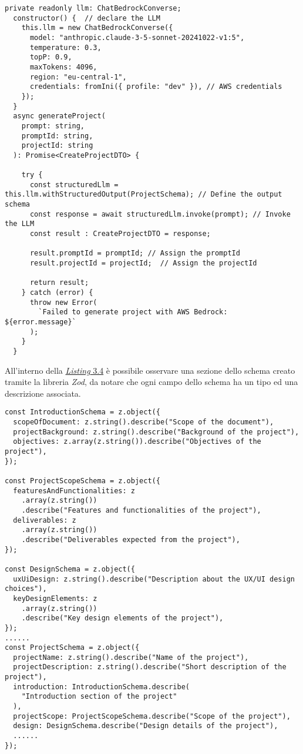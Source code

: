 \begin{lstlisting}[caption={Dichiarazione \gls{llm} e sua invocazione}, label={lst:funzione-generazione-progetto}]
private readonly llm: ChatBedrockConverse;
  constructor() {  // declare the LLM
    this.llm = new ChatBedrockConverse({
      model: "anthropic.claude-3-5-sonnet-20241022-v1:5",
      temperature: 0.3,
      topP: 0.9,
      maxTokens: 4096,
      region: "eu-central-1",
      credentials: fromIni({ profile: "dev" }), // AWS credentials
    });
  }
  async generateProject(
    prompt: string,
    promptId: string,
    projectId: string
  ): Promise<CreateProjectDTO> {

    try {
      const structuredLlm = this.llm.withStructuredOutput(ProjectSchema); // Define the output schema
      const response = await structuredLlm.invoke(prompt); // Invoke the LLM
      const result : CreateProjectDTO = response;

      result.promptId = promptId; // Assign the promptId
      result.projectId = projectId;  // Assign the projectId

      return result;
    } catch (error) {
      throw new Error(
        `Failed to generate project with AWS Bedrock: ${error.message}`
      );
    }
  }
\end{lstlisting}
\pagebreak
\noindent All'interno della {\hyperref[lst:funzione-generazione-progetto]{\textit{Listing} 3.4}} è possibile osservare una sezione dello schema creato tramite la libreria \textit{Zod}, da notare che ogni campo dello schema ha un tipo ed una descrizione associata. 

\begin{lstlisting}[caption={Schema \textit{Zod} dell'output dell'\gls{llm}}, label={lst:schema-zod}]
const IntroductionSchema = z.object({
  scopeOfDocument: z.string().describe("Scope of the document"),
  projectBackground: z.string().describe("Background of the project"),
  objectives: z.array(z.string()).describe("Objectives of the project"),
});

const ProjectScopeSchema = z.object({
  featuresAndFunctionalities: z
    .array(z.string())
    .describe("Features and functionalities of the project"),
  deliverables: z
    .array(z.string())
    .describe("Deliverables expected from the project"),
});

const DesignSchema = z.object({
  uxUiDesign: z.string().describe("Description about the UX/UI design choices"),
  keyDesignElements: z
    .array(z.string())
    .describe("Key design elements of the project"),
});
......
const ProjectSchema = z.object({
  projectName: z.string().describe("Name of the project"),
  projectDescription: z.string().describe("Short description of the project"),
  introduction: IntroductionSchema.describe(
    "Introduction section of the project"
  ),
  projectScope: ProjectScopeSchema.describe("Scope of the project"),
  design: DesignSchema.describe("Design details of the project"),
  ......
});
\end{lstlisting}

